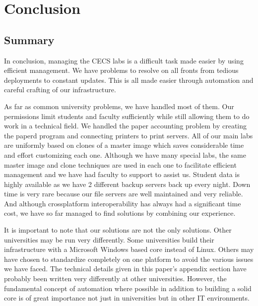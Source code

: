 \chapter{Conclusion} \label{ch:conclusion}
\section{Summary} \label{sec:summary}
In conclusion, managing the CECS labs is a difficult task made easier by using efficient management.  We have problems to resolve on all fronts from tedious deployments to constant updates.  This is all made easier through automation and careful crafting of our infrastructure.  


As far as common university problems, we have handled most of them.  Our permissions limit students and faculty sufficiently while still allowing them to do work in a technical field.  We handled the paper accounting problem by creating the paperd program and connecting printers to print servers.  All of our main labs are uniformly based on clones of a master image which saves considerable time and effort customizing each one.  Although we have many special labs, the same master image and clone techniques are used in each one to facilitate efficient management and we have had faculty to support to assist us.  Student data is highly available as we have 2 different backup servers back up every night.  Down time is very rare because our file servers are well maintained and very reliable.  And although crossplatform interoperability has always had a significant time cost, we have so far managed to find solutions by combining our experience.

It is important to note that our solutions are not the only solutions.  Other universities may be run very differently.  Some universities build their infrastructure with a Microsoft Windows based core instead of Linux.  Others may have chosen to standardize completely on one platform to avoid the various issues we have faced.  The technical details given in this paper's appendix section have probably been written very differently at other universities.  However, the fundamental concept of automation where possible in addition to building a solid core is of great importance not just in universities but in other IT environments. 
